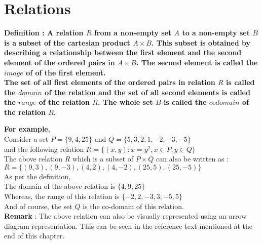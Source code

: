 \documentclass[12pt, letterpaper]{article}
\begin{document}
\section{Relations}
\begin{displayquote}
\textbf{Definition : A relation $R$ from a non-empty set $A$ to a non-empty set $B$ is a subset of the cartesian product $A \times B$. This subset is obtained by describing a relationship between the first element and the second element of the ordered pairs in $A \times B$. The second element is called the  $image$ of of the first element.\\
The set of all first elements of the ordered pairs in relation $R$ is called the $domain$ of the relation and the set of all second elements is called the $range$ of the relation $R$. The whole set $B$ is called the $codomain$ of the relation $R$.}
\end{displayquote}
\textbf{For example},\\
 Consider a set $P = \{9,4,25\}$ and $Q = \{5,3,2,1,-2,-3,-5\}$\\
 and the following relation $R = \{(x,y) : x = y^2, x \in P, y \in Q\}$\\
The above relation $R$ which is a subset of $P \times Q$ can also be written as :\\
$R = \{(9,3), (9,-3), (4,2), (4,-2), (25,5), (25,-5)\}$\\
As per the definition, \\
The domain of the above relation is $\{4,9,25\}$\\
Whereas, the range of this relation is $\{-2,2,-3,3,-5,5\}$\\
And of course, the set $Q$ is the co-domain of this relation.\\
\textbf{Remark} : The above relation can also be visually represented using an arrow diagram representation. This can be seen in the reference text mentioned at the end of this chapter.
\end{document}
